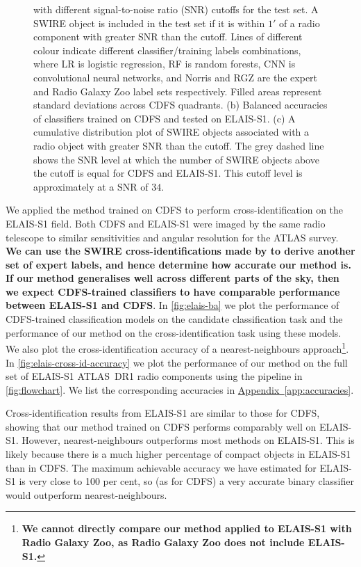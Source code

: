 \documentclass[fleqn,usenatbib,usedcolumn]{mnras}
\newcommand{\edited}[1]{{\bf {#1}}}
\newcommand{\aref}[1]{\hyperref[#1]{Appendix~\ref{#1}}}
\begin{document}
\begin{figure}
{      with different signal-to-noise ratio (SNR) cutoffs for the test set. A
      SWIRE object is included in the test set if it is within $1'$ of a radio
      component with greater SNR than the cutoff. Lines of different colour
      indicate different classifier/training labels combinations, where LR is
      logistic regression, RF is random forests, CNN is convolutional neural
      networks, and Norris and RGZ are the expert and Radio Galaxy Zoo label
      sets respectively. Filled areas represent standard deviations across
      CDFS quadrants. (b) Balanced accuracies of classifiers trained on CDFS
      and tested on ELAIS-S1. (c) A cumulative distribution plot of SWIRE
      objects associated with a radio object with greater SNR than the cutoff.
      The grey dashed line shows the SNR level at which the number of SWIRE
      objects above the cutoff is equal for CDFS and ELAIS-S1. This cutoff level
      is approximately at a SNR of $34$.}
    \label{fig:accuracies-flux}
  \end{figure}

  We applied the method trained on CDFS to perform cross-identification on the
  ELAIS-S1 field. Both CDFS and ELAIS-S1 were imaged by the same radio
  telescope to similar sensitivities and angular resolution for the ATLAS
  survey. \edited{We can use the SWIRE cross-identifications made by
  \citet{middelberg08} to derive another set of expert labels, and hence
  determine how accurate our method is. If our method generalises well across
  different parts of the sky, then we expect CDFS-trained classifiers to have
  comparable performance between ELAIS-S1 and CDFS}. In \autoref{fig:elais-ba}
  we plot the performance of CDFS-trained classification models on the candidate classification task and
  the performance of our method on the cross-identification task using these models. We also plot
  the cross-identification accuracy of a nearest-neighbours approach\footnote{\edited{We cannot
  directly compare our method applied to ELAIS-S1 with Radio Galaxy Zoo, as
  Radio Galaxy Zoo does not include ELAIS-S1.}}. In
  \autoref{fig:elais-cross-id-accuracy} we plot the performance of our method
  on the full set of ELAIS-S1 ATLAS~DR1 radio components using the pipeline in
  \autoref{fig:flowchart}. We list the corresponding accuracies in
  \aref{app:accuracies}.

  Cross-identification results from ELAIS-S1 are similar to those for CDFS,
  showing that our method trained on CDFS performs comparably well on
  ELAIS-S1. However, nearest-neighbours outperforms most methods on ELAIS-S1.
  This is likely because there is a much higher percentage of compact objects
  in ELAIS-S1 than in CDFS. The maximum achievable accuracy we have estimated
  for ELAIS-S1 is very close to 100 per cent, so (as for CDFS) a very accurate
  binary classifier would outperform nearest-neighbours.
\end{document}
